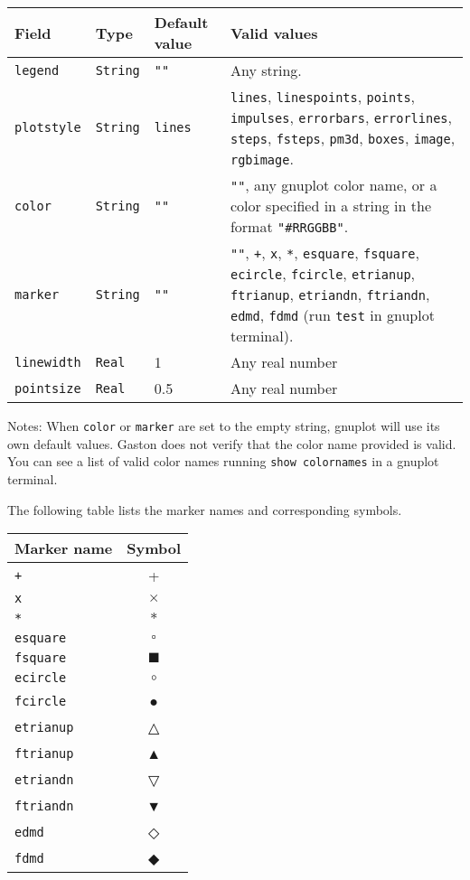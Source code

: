 \documentclass[11pt]{article}
\newcommand{\cmd}[1]{\texttt{#1}}
\begin{document}
{\small
\begin{center}
	\begin{tabular}{lp{1.5cm}p{2cm}p{7.5cm}}
	\toprule
	\textbf{Field} & \textbf{Type} & \textbf{Default value} & \textbf{Valid values} \\
	\midrule
	\cmd{legend} & \cmd{String} & \cmd{""} & Any string. \\
	\cmd{plotstyle} & \cmd{String} & \cmd{lines} & \cmd{lines}, \cmd{linespoints},
	\cmd{points}, \cmd{impulses}, \cmd{errorbars}, \cmd{errorlines},
  \cmd{steps}, \cmd{fsteps},
	\cmd{pm3d}, \cmd{boxes}, \cmd{image}, \cmd{rgbimage}. \\
	\cmd{color} & \cmd{String} & \cmd{""} & \cmd{""}, any gnuplot color name,
	or a color specified in a string in the format \cmd{"\#RRGGBB"}. \\
	\cmd{marker} & \cmd{String} & \cmd{""} & \cmd{""}, \cmd{+}, \cmd{x}, \cmd{*}, \cmd{esquare},
	\cmd{fsquare}, \cmd{ecircle}, \cmd{fcircle}, \cmd{etrianup},
	\cmd{ftrianup}, \cmd{etriandn}, \cmd{ftriandn}, \cmd{edmd}, \cmd{fdmd} (run
	\cmd{test} in gnuplot terminal). \\
	\cmd{linewidth} & \cmd{Real} & 1 & Any real number \\
	\cmd{pointsize} & \cmd{Real} & 0.5 & Any real number \\
	\bottomrule
\end{tabular}
\end{center}}

Notes: When \cmd{color} or \cmd{marker} are set to the empty string, gnuplot will use
its own default values. Gaston does not verify that the color name provided is
valid. You can see a list of valid color names running \cmd{show colornames} in
a gnuplot terminal.

The following table lists the marker names and corresponding symbols.

{\small
\begin{center}
\begin{tabular}{lc}
	\toprule
	\textbf{Marker name} & \textbf{Symbol} \\
	\midrule
	\cmd{+} & + \\
	\cmd{x} & $\times$ \\
	\cmd{*} & $\ast$ \\
	\cmd{esquare} & $\square$ \\
	\cmd{fsquare} & $\blacksquare$ \\
	\cmd{ecircle} & $\circ$ \\
	\cmd{fcircle} & ● \\
	\cmd{etrianup} & △ \\
	\cmd{ftrianup} & ▲ \\
	\cmd{etriandn} & ▽ \\
	\cmd{ftriandn} & ▼ \\
	\cmd{edmd} & ◇ \\
	\cmd{fdmd} & ◆ \\
	\bottomrule
\end{tabular}
\end{center}}
\end{document}
